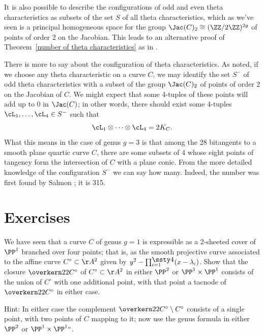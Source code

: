  It is also
 possible to describe the configurations of odd and even theta
characteristics as subsets of the set $S$ of all theta characteristics,
which as we've seen is a principal
homogeneous space for the group
$\Jac(C)_2 \cong (\ZZ/2\ZZ)^{2g}$ of
points of order 2 on the Jacobian.
%
 This leads to an alternative proof of 
Theorem~\ref{number of theta characteristics} as in \cite{JHPaper}.

\begin{fact}
There is more to say about the configuration of theta characteristics. 
As noted, if we choose any theta characteristic on a curve $C$, we may
 identify the set $S^-$ of odd theta characteristics with a subset of the
 group $\Jac(C)_2$ of points of order 2 on the Jacobian of $C$. We might
 expect that some 4-tuples of these points will add up to 0 in $\Jac(C)$;
 in other words, there should exist some 4-tuples $\cL_1,\dots,\cL_4
 \in S^-$ such that
$$
\cL_1\otimes \dots \otimes\cL_4 = 2K_C.
$$
What this means in the case of genus $g=3$ is that among the 28 bitangents
%
to a smooth plane quartic curve $C$, there are some subsets of 4 whose
eight points of tangency form the intersection of $C$ with a plane
conic. From the more detailed knowledge of the configuration $S^-$
we can say how many. Indeed, the number was first found by Salmon
%
\citeyear{MR0115124};
it is 315.
\end{fact}

\section{Exercises}
 \begin{exercise}
  We have seen that a curve $C$ of genus $g=1$ is expressible as a
  2-sheeted cover of $\PP^1$ branched over four points; that is, as
  the smooth projective curve associated to the affine curve $C^\circ
  \subset \AA^2$ given by $y^2 - 
\smash{\prod_{i=1}^{\smash{\lower1.5pt\hbox{$\ssty4$}}} (x-\lambda_i)}$. 
  Show that
  the closure $\overkern22{C^\circ}$ of $C^\circ \subset \AA^2$ in either
  $\PP^2$ or $\PP^1 \times \PP^1$ consists of the union of $C^\circ$ with
  one additional point, with that point a tacnode of $\overkern22{C^\circ}$
  in either case.

  Hint:
 In either case the complement $\overkern22{C^\circ}
  \setminus C^\circ$ consists of a single point, with two points of $C$
  mapping to it; now use the genus formula in either $\PP^2$ or $\PP^1
  \times \PP^1` `$.
  \end{exercise}

